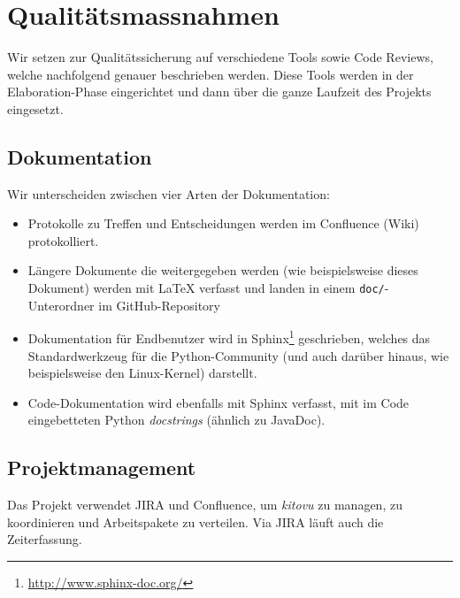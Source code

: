 \documentclass[a4paper]{article}
\begin{document}
\section{Qualitätsmassnahmen}
%

Wir setzen zur Qualitätssicherung auf verschiedene Tools sowie Code Reviews,
welche nachfolgend genauer beschrieben werden. Diese Tools werden in der
Elaboration-Phase eingerichtet und dann über die ganze Laufzeit des Projekts
eingesetzt.

\subsection{Dokumentation}

Wir unterscheiden zwischen vier Arten der Dokumentation:

\begin{itemize}
  \item Protokolle zu Treffen und Entscheidungen werden im Confluence (Wiki) protokolliert.
  \item Längere Dokumente die weitergegeben werden (wie beispielsweise dieses
    Dokument) werden mit \LaTeX{} verfasst und landen in einem
    \texttt{doc/}-Unterordner im GitHub-Repository
  \item Dokumentation für Endbenutzer wird in
    Sphinx\footnote{\url{http://www.sphinx-doc.org/}} geschrieben, welches das
    Standardwerkzeug für die Python-Community (und auch darüber hinaus, wie
    beispielsweise den Linux-Kernel) darstellt.
  \item Code-Dokumentation wird ebenfalls mit Sphinx verfasst, mit im Code
    eingebetteten Python \emph{docstrings} (ähnlich zu JavaDoc).
\end{itemize}

\subsection{Projektmanagement}
Das Projekt verwendet JIRA und Confluence, um \emph{kitovu} zu managen, zu koordinieren und Arbeitspakete zu verteilen. Via JIRA läuft auch die Zeiterfassung.
\end{document}
